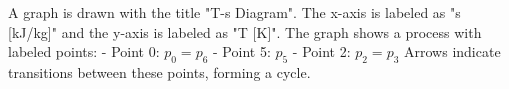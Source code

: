 A graph is drawn with the title "T-s Diagram". The x-axis is labeled as "s [kJ/kg]" and the y-axis is labeled as "T [K]". The graph shows a process with labeled points:  
- Point 0: \( p_0 = p_6 \)  
- Point 5: \( p_5 \)  
- Point 2: \( p_2 = p_3 \)  
Arrows indicate transitions between these points, forming a cycle.